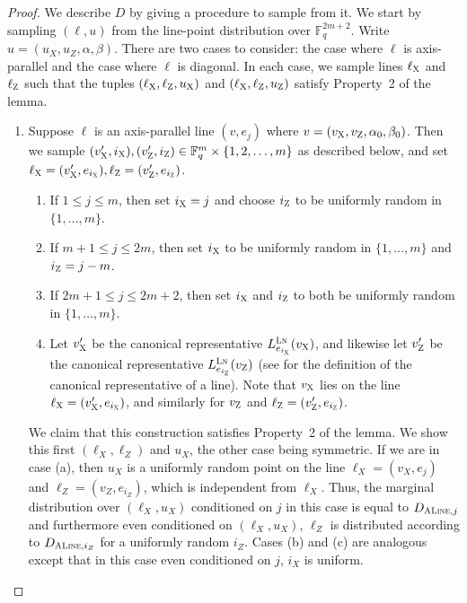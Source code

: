 \documentclass[11pt]{article}
\theoremstyle{definition}
\newcommand{\F}{\ensuremath{\mathbb{F}}}
\newcommand{\labelstyle}[1]{\ensuremath{\textsc{#1}}\xspace}
\newcommand{\xpt}{\labelstyle{X}}
\newcommand{\zpt}{\labelstyle{Z}}
\newcommand{\lnf}{\labelstyle{Ln}}
\newcommand{\typestyle}[1]{\ensuremath{\textsc{#1}}\xspace}
\renewcommand{\line}{\mathbf{\ell}}
\newcommand{\ALine}{\typestyle{ALine}}
\begin{document}
    \begin{proof}
      We describe $D$ by giving a procedure to sample from it. We start by sampling $(\line, u)$ from the line-point distribution over $\F_q^{2m+2}$. Write $u = (u_X, u_Z, \alpha, \beta)$. 
	There are two cases to consider: the case where $\line$ is
        axis-parallel and the case where $\line$ is diagonal. In each case, we sample lines $\line_\xpt$ and $\line_\zpt$ such that the tuples  $(\line_\xpt,
        \line_\zpt,u_\xpt)$ and $(\line_\xpt, \line_\zpt,u_\zpt)$ satisfy Property~2 of the lemma.
        \begin{enumerate}
          \item Suppose $\line$ is an  axis-parallel line $(v,e_j)$ where
            $v = (v_\xpt,v_\zpt,\alpha_0,\beta_0)$. Then we sample $(v'_\xpt, i_\xpt), (v'_\zpt, i_\zpt) \in \F_q^m \times \{1,2, \ldots, m\}$ as described below, and set $\line_\xpt =
            (v'_\xpt,e_{i_\xpt}),\line_\zpt = (v'_\zpt, e_{i_\zpt})$.
            \begin{enumerate}
              \item If $1 \leq j \leq m$, then set $i_\xpt = j$ and
                choose $i_\zpt$ to be uniformly random in $\{1, \dots,
                m\}$.
              \item If  $m+1 \leq j \leq 2m$, then set $i_\xpt$ to be
                uniformly random in $\{1, \dots, m\}$ and $i_\zpt = j - m$.
              \item If $2m + 1 \leq j \leq 2m+2$, then set $i_\xpt$
                and $i_\zpt$ to both be uniformly random in $\{1, \dots, m\}$.
              \item Let $v'_\xpt$ be the canonical representative
                $L_{e_{i_\xpt}}^\lnf(v_\xpt)$, and
                likewise let $v'_\zpt$ be the canonical
                representative $L_{e_{i_\zpt}}^\lnf(v_{\zpt})$ (see
                 for the definition of
                the canonical representative of a line). Note that
                $v_\xpt$ lies on the line $\line_\xpt = (v'_\xpt,
                e_{i_\xpt})$, and similarly for $v_\zpt$ and
                $\line_{\zpt} = (v'_\zpt, e_{i_\zpt})$.
              \end{enumerate}
              We claim that this construction satisfies Property~2 of the lemma. We show this first $(\line_X,\line_Z)$ and $u_X$, the other case being symmetric. If we are in case (a), then $u_X$ is a uniformly random point on the line $\line_X=(v_X, e_j)$ and $\line_Z=(v_Z,e_{i_Z})$, which is independent from $\line_X$. Thus, the marginal distribution over $(\line_X,u_X)$ conditioned on $j$ in this case is equal to $D_{\ALine, j}$ and furthermore even conditioned on $(\line_X,u_X)$, $\line_Z$ is distributed according to $D_{\ALine,i_Z}$ for a uniformly random $i_Z$. Cases (b) and (c) are analogous except that in this case even conditioned on $j$, $i_X$ is uniform. 

\end{enumerate}
\end{proof}
\end{document}
